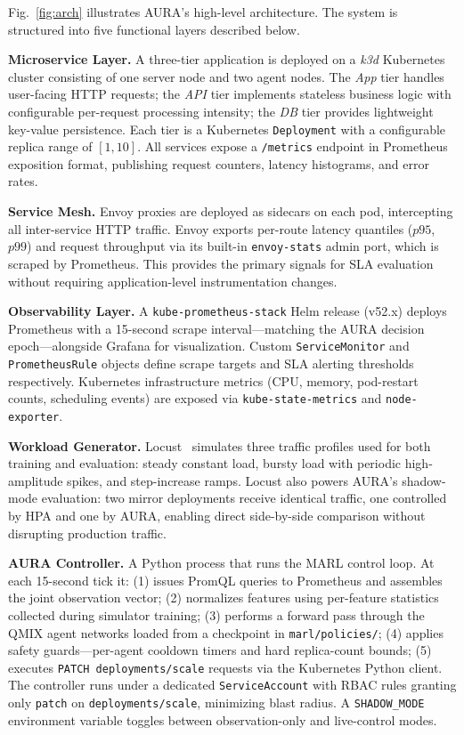 \documentclass[conference]{IEEEtran}
\begin{document}
Fig.~\ref{fig:arch} illustrates AURA's high-level architecture.
The system is structured into five functional layers described below.

\textbf{Microservice Layer.} A three-tier application is deployed on
a \textit{k3d} Kubernetes cluster consisting of one server node and
two agent nodes. The \emph{App} tier handles user-facing HTTP
requests; the \emph{API} tier implements stateless business logic
with configurable per-request processing intensity; the \emph{DB}
tier provides lightweight key-value persistence. Each tier is a
Kubernetes \texttt{Deployment} with a configurable replica range of
$[1, 10]$. All services expose a \texttt{/metrics} endpoint in
Prometheus exposition format, publishing request counters, latency
histograms, and error rates.

\textbf{Service Mesh.} Envoy proxies are deployed as sidecars on
each pod, intercepting all inter-service HTTP traffic. Envoy
exports per-route latency quantiles ($p95$, $p99$) and request
throughput via its built-in \texttt{envoy-stats} admin port, which
is scraped by Prometheus. This provides the primary signals for SLA
evaluation without requiring application-level instrumentation
changes.

\textbf{Observability Layer.} A \texttt{kube-prometheus-stack}
Helm release (v52.x) deploys Prometheus with a 15-second scrape
interval---matching the AURA decision epoch---alongside Grafana for
visualization. Custom \texttt{ServiceMonitor} and
\texttt{PrometheusRule} objects define scrape targets and SLA
alerting thresholds respectively. Kubernetes infrastructure metrics
(CPU, memory, pod-restart counts, scheduling events) are exposed
via \texttt{kube-state-metrics} and \texttt{node-exporter}.

\textbf{Workload Generator.} Locust~\cite{Locust} simulates three
traffic profiles used for both training and evaluation: steady
constant load, bursty load with periodic high-amplitude spikes, and
step-increase ramps. Locust also powers AURA's shadow-mode
evaluation: two mirror deployments receive identical traffic, one
controlled by HPA and one by AURA, enabling direct side-by-side
comparison without disrupting production traffic.

\textbf{AURA Controller.} A Python process that runs the MARL
control loop. At each 15-second tick it: (1) issues PromQL queries
to Prometheus and assembles the joint observation vector; (2)
normalizes features using per-feature statistics collected during
simulator training; (3) performs a forward pass through the QMIX
agent networks loaded from a checkpoint in
\texttt{marl/policies/}; (4) applies safety guards---per-agent
cooldown timers and hard replica-count bounds; (5) executes
\texttt{PATCH deployments/scale} requests via the Kubernetes Python
client. The controller runs under a dedicated \texttt{ServiceAccount}
with RBAC rules granting only \texttt{patch} on
\texttt{deployments/scale}, minimizing blast radius. A
\texttt{SHADOW\_MODE} environment variable toggles between
observation-only and live-control modes.
\end{document}
